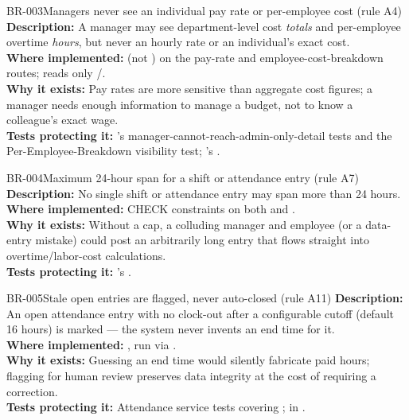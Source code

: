 \begin{businessrule}{BR-003}{Managers never see an individual pay rate or per-employee cost (rule A4)}
\textbf{Description:} A manager may see department-level cost
\emph{totals} and per-employee overtime \emph{hours}, but never an
hourly rate or an individual's exact cost.\\
\textbf{Where implemented:}  (not
) on the pay-rate and employee-cost-breakdown
routes;  reads only
/.\\
\textbf{Why it exists:} Pay rates are more sensitive than aggregate
cost figures; a manager needs enough information to manage a budget,
not to know a colleague's exact wage.\\
\textbf{Tests protecting it:} 's
manager-cannot-reach-admin-only-detail tests and the
Per-Employee-Breakdown visibility test; 's
.
\end{businessrule}

\begin{businessrule}{BR-004}{Maximum 24-hour span for a shift or attendance entry (rule A7)}
\textbf{Description:} No single shift or attendance entry may span more
than 24 hours.\\
\textbf{Where implemented:}  CHECK
constraints on both  and .\\
\textbf{Why it exists:} Without a cap, a colluding manager and employee
(or a data-entry mistake) could post an arbitrarily long entry that
flows straight into overtime/labor-cost calculations.\\
\textbf{Tests protecting it:} 's
.
\end{businessrule}

\begin{businessrule}{BR-005}{Stale open entries are flagged, never auto-closed (rule A11)}
\textbf{Description:} An open attendance entry with no clock-out after
a configurable cutoff (default 16 hours) is marked 
--- the system never invents an end time for it.\\
\textbf{Where implemented:} ,
run via .\\
\textbf{Why it exists:} Guessing an end time would silently fabricate
paid hours; flagging for human review preserves data integrity at the
cost of requiring a correction.\\
\textbf{Tests protecting it:} Attendance service tests covering
;  in
.
\end{businessrule}

